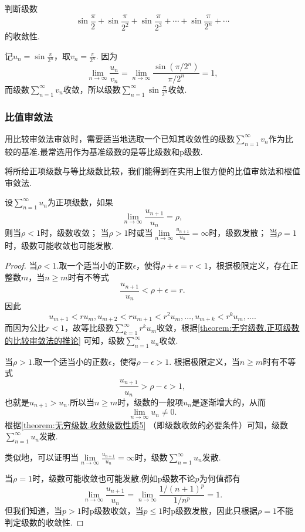 \begin{example}
\newcommand\sinfrac[1][]{\sin\frac{\pi}{2^{#1}}}
判断级数\[
\sinfrac + \sinfrac[2] + \sinfrac[3] + \dotsb + \sinfrac[n] + \dotsb
\]的收敛性.
\begin{solution}
记\(u_n = \sin\frac{\pi}{2^n}\)，取\(v_n = \frac{\pi}{2^n}\).
因为\[
\lim\limits_{n\to\infty} \frac{u_n}{v_n}
= \lim\limits_{n\to\infty} \frac{\sin(\pi/2^n)}{\pi/2^n} = 1,
\]而级数\(\sum\limits_{n=1}^\infty v_n\)收敛，所以级数\(\sum\limits_{n=1}^\infty \sin\frac{\pi}{2^n}\)收敛.
\end{solution}
\end{example}

\subsubsection{比值审敛法}
用比较审敛法审敛时，需要适当地选取一个已知其收敛性的级数\(\sum\limits_{n=1}^\infty v_n\)作为比较的基准.最常选用作为基准级数的是等比级数和p级数.

将所给正项级数与等比级数比较，我们能得到在实用上很方便的比值审敛法和根值审敛法.
\begin{theorem}\label{theorem:无穷级数.正项级数的比值审敛法}
设\(\sum\limits_{n=1}^\infty u_n\)为正项级数，如果\[
\lim\limits_{n\to\infty} \frac{u_{n+1}}{u_n}=\rho,
\]则当\(\rho<1\)时，级数收敛；
当\(\rho>1\)时或当\(\lim\limits_{n\to\infty} \frac{u_{n+1}}{u_n}=\infty\)时，级数发散；
当\(\rho=1\)时，级数可能收敛也可能发散.
\begin{proof}
当\(\rho<1\).取一个适当小的正数\(\epsilon\)，使得\(\rho+\epsilon=r<1\)，根据极限定义，存在正整数\(m\)，当\(n \geq m\)时有不等式\[
\frac{u_{n+1}}{u_n} < \rho + \epsilon = r.
\]因此\[
u_{m+1} < r u_m,
u_{m+2} < r u_{m+1} < r^2 u_m,
\dotsc,
u_{m+k} < r^k u_m,
\dotsc.
\]而因为公比\(r<1\)，故等比级数\(\sum\limits_{k=1}^\infty r^k u_m\)收敛，根据\cref{theorem:无穷级数.正项级数的比较审敛法的推论} 可知，级数\(\sum\limits_{n=1}^\infty u_n\)收敛.

当\(\rho>1\).取一个适当小的正数\(\epsilon\)，使得\(\rho-\epsilon>1\).
根据极限定义，当\(n \geq m\)时有不等式\[
\frac{u_{n+1}}{u_n} > \rho-\epsilon > 1,
\]也就是\(u_{n+1}>u_n\).所以当\(n \geq m\)时，级数的一般项\(u_n\)是逐渐增大的，从而\[
\lim\limits_{n\to\infty} u_n \neq 0.
\]根据\cref{theorem:无穷级数.收敛级数性质5} （即级数收敛的必要条件）可知，级数\(\sum\limits_{n=1}^\infty u_n\)发散.

类似地，可以证明当\(\lim\limits_{n\to\infty} \frac{u_{n+1}}{u_n} = \infty\)时，级数\(\sum\limits_{n=1}^\infty u_n\)发散.

当\(\rho = 1\)时，级数可能收敛也可能发散.例如p级数不论\(p\)为何值都有\[
\lim\limits_{n\to\infty} \frac{u_{n+1}}{u_n} = \lim\limits_{n\to\infty} \frac{1/(n+1)^p}{1/n^p} = 1.
\]但我们知道，当\(p>1\)时p级数收敛，当\(p\leq1\)时p级数发散，因此只根据\(\rho=1\)不能判定级数的收敛性.
\end{proof}
\end{theorem}

